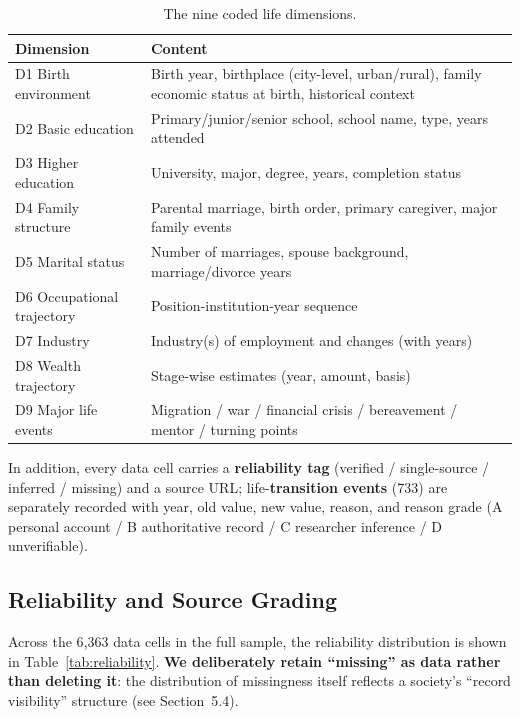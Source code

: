 \documentclass[11pt,a4paper]{article}
\begin{document}
\begin{table}[htbp]
\centering
\caption{The nine coded life dimensions.}
\label{tab:dims}
\small
\begin{tabular}{@{}lp{11cm}@{}}
\toprule
Dimension & Content \\
\midrule
D1 Birth environment & Birth year, birthplace (city-level, urban/rural), family economic status at birth, historical context \\
D2 Basic education & Primary/junior/senior school, school name, type, years attended \\
D3 Higher education & University, major, degree, years, completion status \\
D4 Family structure & Parental marriage, birth order, primary caregiver, major family events \\
D5 Marital status & Number of marriages, spouse background, marriage/divorce years \\
D6 Occupational trajectory & Position-institution-year sequence \\
D7 Industry & Industry(s) of employment and changes (with years) \\
D8 Wealth trajectory & Stage-wise estimates (year, amount, basis) \\
D9 Major life events & Migration / war / financial crisis / bereavement / mentor / turning points \\
\bottomrule
\end{tabular}
\end{table}

In addition, every data cell carries a \textbf{reliability tag} (verified / single-source / inferred / missing) and a source URL; life-\textbf{transition events} (733) are separately recorded with year, old value, new value, reason, and reason grade (A personal account / B authoritative record / C researcher inference / D unverifiable).

\subsection{Reliability and Source Grading}
\label{sec:reliability}

Across the 6{,}363 data cells in the full sample, the reliability distribution is shown in Table~\ref{tab:reliability}. \textbf{We deliberately retain ``missing'' as data rather than deleting it}: the distribution of missingness itself reflects a society's ``record visibility'' structure (see Section~5.4).
\end{document}
